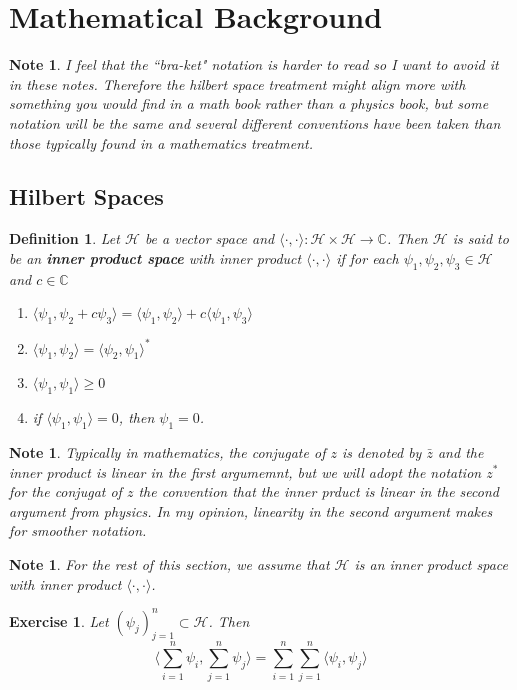 \documentclass[12pt]{amsart}
\newtheorem{defn}[thm]{Definition}
\newtheorem{note}[thm]{Note}
\newtheorem{ex}[thm]{Exercise}
\renewcommand{\r}{\rangle}
\renewcommand{\l}{\langle}
\newcommand{\C}{\mathbb{C}}
\newcommand{\MH}{\mathcal{H}}
\begin{document}
\section{Mathematical Background}

\begin{note}
	I feel that the ``bra-ket" notation is harder to read so I want to avoid it in these notes. Therefore the hilbert space treatment might align more with something you would find in a math book rather than a physics book, but some notation will be the same and several different conventions have been taken than those typically found in a mathematics treatment. 
\end{note}

\subsection{Hilbert Spaces}
\begin{defn}
	Let $\MH$ be a vector space and $\l \cdot, \cdot\r: \MH \times \MH \rightarrow \C$. Then $\MH$ is said to be an \textbf{inner product space} with inner product $\l \cdot, \cdot\r$ if for each $\psi_1,\psi_2,\psi_3 \in \MH$and $c \in \C$
	\begin{enumerate}
		\item $\l \psi_1 , \psi_2 + c\psi_3\r = \l \psi_1 , \psi_2 \r + c\l \psi_1 , \psi_3\r $
		\item $\l \psi_1 , \psi_2 \r = \l \psi_2 , \psi_1\r^*$
		\item $\l \psi_1 , \psi_1 \r \geq 0$
		\item if $\l \psi_1 ,\psi_1 \r = 0$, then $\psi_1 = 0$.  
	\end{enumerate}
\end{defn}

\begin{note}
	Typically in mathematics, the conjugate of $z$ is denoted by $ \bar{z}$ and the inner product is linear in the first argumemnt, but we will adopt the notation $z^*$ for the conjugat of $z$ the convention that the inner prduct is linear in the second argument from physics. In my opinion, linearity in the second argument makes for smoother notation.
\end{note}

\begin{note}
	For the rest of this section, we assume that $\MH$ is an inner product space with inner product $\l \cdot , \cdot \r$.
\end{note}

\begin{ex}
	Let $(\psi_j)_{j =1}^n \subset \MH$. Then $$\bigg \l \sum_{i=1}^n \psi_i , \sum_{j=1}^n \psi_j \bigg \r = \sum_{i=1}^n \sum_{j=1}^n \l \psi_i , \psi_j \r $$
\end{ex}
\end{document}
